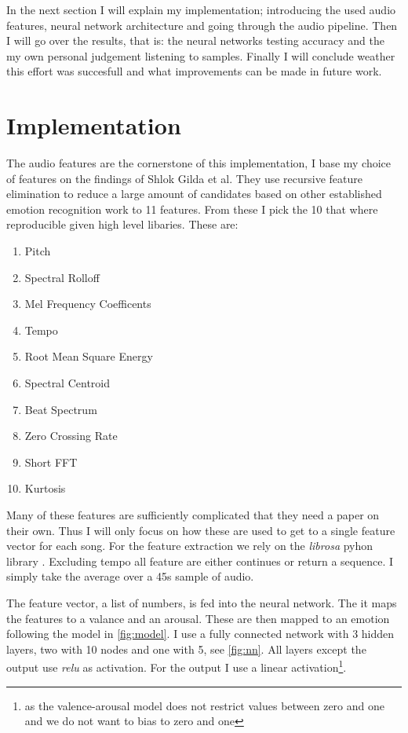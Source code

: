 \documentclass[lang=en, hanging-titles=true]{skrapport}
\begin{document}
In the next section I will explain my implementation; introducing the used audio features, neural network architecture and going through the audio pipeline. Then I will go over the results, that is: the neural networks testing accuracy and the my own personal judgement listening to samples. Finally I will conclude weather this effort was succesfull and what improvements can be made in future work.

\section{Implementation}
The audio features are the cornerstone of this implementation, I base my choice of features on the findings of Shlok Gilda et al\cite{features}. They use recursive feature elimination to reduce a large amount of candidates based on other established emotion recognition work to 11 features. From these I pick the 10 that where reproducible given high level libaries. These are:

\begin{multicols}{2}
\begin{enumerate}
	\item Pitch
	\item Spectral Rolloff
	\item Mel Frequency Coefficents
	\item Tempo
	\item Root Mean Square Energy
	\item Spectral Centroid
	\item Beat Spectrum
	\item Zero Crossing Rate
	\item Short FFT
	\item Kurtosis
\end{enumerate}
\end{multicols}

Many of these features are sufficiently complicated that they need a paper on their own. Thus I will only focus on how these are used to get to a single feature vector for each song. For the feature extraction we rely on the \textit{librosa} pyhon library \cite{librosa}. Excluding tempo all feature are either continues or return a sequence. I simply take the average over a 45s sample of audio. 

The feature vector, a list of numbers, is fed into the neural network. The it maps the features to a valance and an arousal. These are then mapped to an emotion following the model in \cref{fig:model}. I use a fully connected network with 3 hidden layers, two with 10 nodes and one with 5, see \cref{fig:nn}. All layers except the output use \textit{relu} as activation. For the output I use a linear activation\footnote{as the valence-arousal model does not restrict values between zero and one and we do not want to bias to zero and one}.
\end{document}
